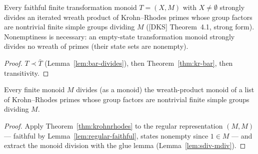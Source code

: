 \begin{theorem}\label{thm:krohnrhodes}
  \leanok
  Every faithful finite transformation monoid $T = (X, M)$ with
  $X \neq \emptyset$ strongly divides an iterated wreath product of
  Krohn--Rhodes primes whose group factors are nontrivial finite
  simple groups dividing $M$ ([DKS] Theorem~4.1, strong form).
  Nonemptiness is necessary: an empty-state transformation monoid
  strongly divides no wreath of primes (their state sets are
  nonempty).
\end{theorem}
\begin{proof}
  \leanok
  $T \prec \bar{T}$ (Lemma~\ref{lem:bar-divides}), then
  Theorem~\ref{thm:kr-bar}, then transitivity.
\end{proof}

\begin{theorem}\label{thm:krohnrhodes-monoid}
  \leanok
  Every finite monoid $M$ divides (as a monoid) the wreath-product
  monoid of a list of Krohn--Rhodes primes whose group factors are
  nontrivial finite simple groups dividing $M$.
\end{theorem}
\begin{proof}
  \leanok
  Apply Theorem~\ref{thm:krohnrhodes} to the regular representation
  $(M, M)$ --- faithful by Lemma~\ref{lem:regular-faithful}, states
  nonempty since $1 \in M$ --- and extract the monoid division with
  the glue lemma (Lemma~\ref{lem:sdiv-mdiv}).
\end{proof}
